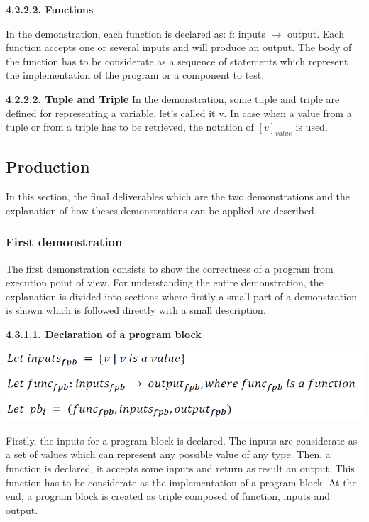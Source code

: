 \documentclass[conference,compsoc]{IEEEtran}
\begin{document}
\noindent
\newline  
\textbf{4.2.2.2. Functions}
\newline

In the demonstration, each function is declared as:   
\newline
f: inputs $\to$ output. Each function accepts one or several inputs and will produce an output. The body of the function has to be considerate as a sequence of statements which represent the implementation of the program or a component to test.

\noindent
\newline  
\textbf{4.2.2.2. Tuple and Triple}
\newline
In the demonstration, some tuple and triple are defined for representing a variable, let's called it v. In case when a value from a tuple or from a triple has to be retrieved, the notation of $[v]_{value}$ is used. 

\subsection{Production }
In this section, the final deliverables which are the two demonstrations and the explanation of how theses demonstrations can be applied are described.

\subsubsection{First demonstration}
The first demonstration consists to show the correctness of a program from execution point of view. For understanding the entire demonstration, the explanation is divided into sections where firstly a small part of a demonstration is shown which is followed directly with a small description. 

\noindent
\newline
\textbf{4.3.1.1. Declaration of a program block}
\begin{center}
\includegraphics[scale=0.5]{Proof1-Part1.png} 
\end{center}

Firstly, the inputs for a program block is declared. The inputs are considerate as a set of values which can represent any possible value of any type. Then, a function is declared, it accepts some inputs and return as result an output. This function has to be considerate as the implementation of a program block. At the end, a program block is created as triple composed of function, inputs and output. 
\end{document}
